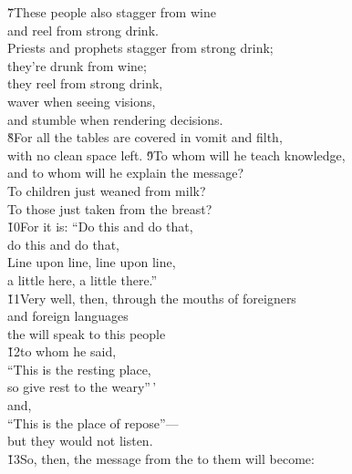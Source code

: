 \begin{poetry}
\poeml \v{7}These people also stagger from wine \\
\poemll    and reel from strong drink. \\
\poeml Priests and prophets stagger from strong drink; \\
\poemll    they're drunk from wine; \\
\poeml they reel from strong drink, \\
\poemll    waver when seeing visions, \\
\poemlll       and stumble when rendering decisions. \\
\poeml \v{8}For all the tables are covered in vomit and filth, \\
\poemll    with no clean space left.
\poeml \v{9}To whom will he teach knowledge, \\
\poemll    and to whom will he explain the message? \\
\poeml To children just weaned from milk? \\
\poemll    To those just taken from the breast? \\
\poeml \v{10}For it is: ``Do this and do that, \\
\poemll    do this and do that, \\
\poeml Line upon line, line upon line, \\
\poemll    a little here, a little there.'' \\
\poeml \v{11}Very well, then, through the mouths of foreigners \\
\poemll    and foreign languages \\
\poemlll       the  will speak to this people \\
\poeml \v{12}to whom he said, \\
\poemll    ``This is the resting place, \\
\poemlll       so give rest to the weary''\,' \\
\poeml and, \\
\poemll    ``This is the place of repose''--- \\
\poemlll       but they would not listen. \\
\poeml \v{13}So, then, the message from the  to them will become: \\

\end{poetry}
